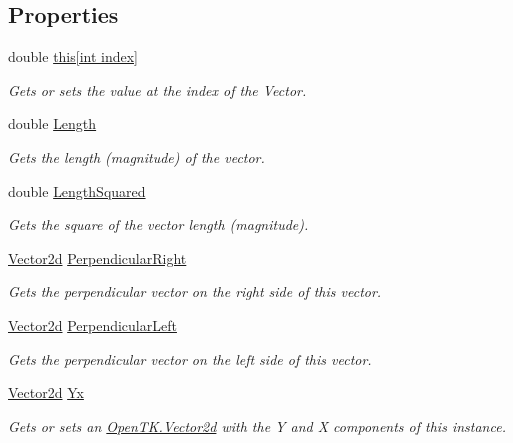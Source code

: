 \subsection*{Properties}
\begin{DoxyCompactItemize}
\item 
double \hyperlink{struct_open_t_k_1_1_vector2d_afb55e4bd5f5fe24a0a7fe0f899bbe876}{this\mbox{[}int index\mbox{]}}
\begin{DoxyCompactList}\small\item\em Gets or sets the value at the index of the Vector. \end{DoxyCompactList}\item 
double \hyperlink{struct_open_t_k_1_1_vector2d_a95c8cd7d1f964c7fb7e7ef0acf1487e4}{Length}
\begin{DoxyCompactList}\small\item\em Gets the length (magnitude) of the vector. \end{DoxyCompactList}\item 
double \hyperlink{struct_open_t_k_1_1_vector2d_abbca0e5c823caed814092dd1d7fadc23}{Length\-Squared}
\begin{DoxyCompactList}\small\item\em Gets the square of the vector length (magnitude). \end{DoxyCompactList}\item 
\hyperlink{struct_open_t_k_1_1_vector2d}{Vector2d} \hyperlink{struct_open_t_k_1_1_vector2d_abcbb2f176283994317680ca8e8a336b3}{Perpendicular\-Right}
\begin{DoxyCompactList}\small\item\em Gets the perpendicular vector on the right side of this vector. \end{DoxyCompactList}\item 
\hyperlink{struct_open_t_k_1_1_vector2d}{Vector2d} \hyperlink{struct_open_t_k_1_1_vector2d_a759a3f93398ef84bf5510c2e486c2f03}{Perpendicular\-Left}
\begin{DoxyCompactList}\small\item\em Gets the perpendicular vector on the left side of this vector. \end{DoxyCompactList}\item 
\hyperlink{struct_open_t_k_1_1_vector2d}{Vector2d} \hyperlink{struct_open_t_k_1_1_vector2d_aec31e1a880019cab41c29650f0facab9}{Yx}
\begin{DoxyCompactList}\small\item\em Gets or sets an \hyperlink{struct_open_t_k_1_1_vector2d}{Open\-T\-K.\-Vector2d} with the Y and X components of this instance. \end{DoxyCompactList}\end{DoxyCompactItemize}


